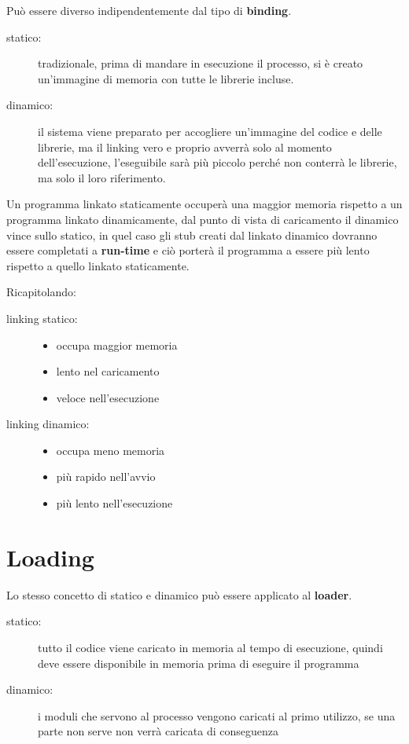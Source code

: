 \documentclass[a4paper, 12pt]{book}
\begin{document}
Può essere diverso indipendentemente dal tipo di \textbf{binding}.
\begin{description}
    \item[statico:] tradizionale, prima di mandare in esecuzione il processo, si è creato un'immagine di memoria con 
    tutte le librerie incluse.
    \item[dinamico:]il sistema viene preparato per accogliere un'immagine del codice e delle librerie, ma il linking vero e
     proprio avverrà solo al momento dell'esecuzione, l'eseguibile sarà più piccolo perché non conterrà le librerie, ma solo 
    il loro riferimento.  
\end{description}

Un programma linkato staticamente occuperà una maggior memoria rispetto a un programma linkato dinamicamente, dal punto di vista
di caricamento il dinamico vince sullo statico, in quel caso gli stub creati dal linkato dinamico dovranno essere completati a 
\textbf{run-time} e ciò porterà il programma a essere più lento rispetto a quello linkato staticamente.

Ricapitolando:
\begin{description}
    \item[linking statico:]\begin{itemize}
        \item occupa maggior memoria
        \item lento nel caricamento
        \item veloce nell'esecuzione
    \end{itemize} 
    \item[linking dinamico:]\begin{itemize}
        \item occupa meno memoria
        \item più rapido nell'avvio
        \item più lento nell'esecuzione
    \end{itemize}
\end{description}

\section{Loading}

Lo stesso concetto di statico e dinamico può essere applicato al \textbf{loader}.
\begin{description}
    \item[statico:] tutto il codice viene caricato in memoria al tempo di esecuzione, quindi deve essere disponibile in 
    memoria prima di eseguire il programma
    \item[dinamico:] i moduli che servono al processo vengono caricati al primo utilizzo, se una parte non serve non verrà
    caricata di conseguenza 
\end{description}
\end{document}
